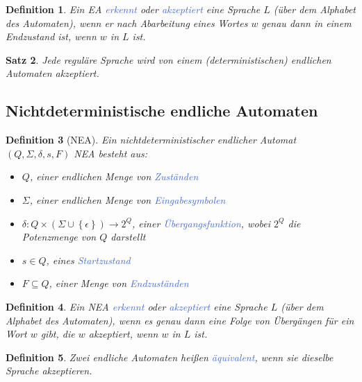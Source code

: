 \documentclass[11pt]{article}
\newcommand{\tcol}[1]{\textcolor{RoyalBlue}{#1}}
\newcommand{\set}[1]{\left\lbrace #1\right\rbrace}
\theoremstyle{break}
\newtheorem{satz}{Satz}[section]
\newtheorem{defi}[satz]{Definition}
\begin{document}
    \begin{defi}
        Ein EA \tcol{erkennt} oder \tcol{akzeptiert} eine Sprache $L$ (über dem Alphabet des Automaten), wenn er nach Abarbeitung eines Wortes $w$ genau dann in einem Endzustand ist, wenn $w$ in $L$ ist.
    \end{defi}

    \begin{satz}
        Jede reguläre Sprache wird von einem (deterministischen) endlichen Automaten akzeptiert.
    \end{satz}


    \subsection{Nichtdeterministische endliche Automaten}
	\label{subsec:nichtdeterministische-endliche-automaten}

    \begin{defi}[NEA]
        Ein nichtdeterministischer endlicher Automat $(Q,\Sigma ,\delta ,s,F)$ NEA besteht aus:
        \begin{itemize}
            \item $Q$, einer endlichen Menge von \tcol{Zuständen}
            \item $\Sigma$, einer endlichen Menge von \tcol{Eingabesymbolen}
            \item $\delta\colon Q\times (\Sigma\cup\set{\epsilon})\to 2^Q$, einer \tcol{Übergangsfunktion}, wobei $2^Q$ die Potenzmenge von $Q$ darstellt
            \item $s\in Q$, eines \tcol{Startzustand}
            \item $F\subseteq Q$, einer Menge von \tcol{Endzuständen}
        \end{itemize}
    \end{defi}

    \begin{defi}
        Ein NEA \tcol{erkennt} oder \tcol{akzeptiert} eine Sprache $L$ (über dem Alphabet des Automaten), wenn es genau dann eine Folge von Übergängen für ein Wort $w$ gibt, die $w$ akzeptiert, wenn $w$ in $L$ ist.
    \end{defi}

    \begin{defi}
        Zwei endliche Automaten heißen \tcol{äquivalent}, wenn sie dieselbe Sprache akzeptieren.
    \end{defi}
\end{document}

